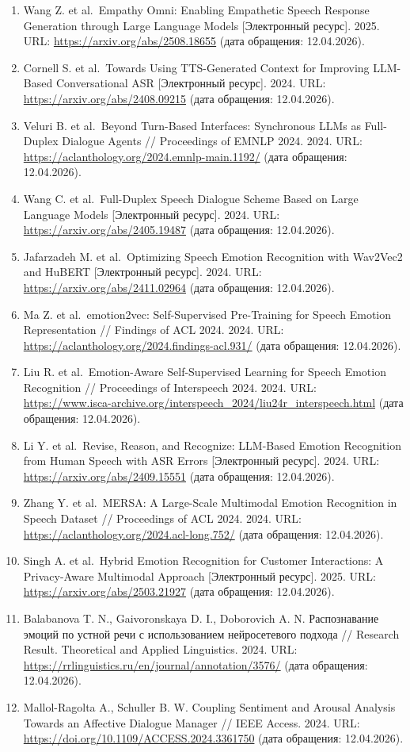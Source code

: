 \documentclass[a4paper,14pt]{extarticle}
\begin{document}
\begin{enumerate}
\item
  Wang Z. et al.~Empathy Omni: Enabling Empathetic Speech Response
  Generation through Large Language Models {[}Электронный ресурс{]}.
  2025. URL: \url{https://arxiv.org/abs/2508.18655} (дата обращения:
  12.04.2026).
\item
  Cornell S. et al.~Towards Using TTS-Generated Context for Improving
  LLM-Based Conversational ASR {[}Электронный ресурс{]}. 2024. URL:
  \url{https://arxiv.org/abs/2408.09215} (дата обращения: 12.04.2026).
\item
  Veluri B. et al.~Beyond Turn-Based Interfaces: Synchronous LLMs as
  Full-Duplex Dialogue Agents // Proceedings of EMNLP 2024. 2024. URL:
  \url{https://aclanthology.org/2024.emnlp-main.1192/} (дата обращения:
  12.04.2026).
\item
  Wang C. et al.~Full-Duplex Speech Dialogue Scheme Based on Large
  Language Models {[}Электронный ресурс{]}. 2024. URL:
  \url{https://arxiv.org/abs/2405.19487} (дата обращения: 12.04.2026).
\item
  Jafarzadeh M. et al.~Optimizing Speech Emotion Recognition with
  Wav2Vec2 and HuBERT {[}Электронный ресурс{]}. 2024. URL:
  \url{https://arxiv.org/abs/2411.02964} (дата обращения: 12.04.2026).
\item
  Ma Z. et al.~emotion2vec: Self-Supervised Pre-Training for Speech
  Emotion Representation // Findings of ACL 2024. 2024. URL:
  \url{https://aclanthology.org/2024.findings-acl.931/} (дата обращения:
  12.04.2026).
\item
  Liu R. et al.~Emotion-Aware Self-Supervised Learning for Speech
  Emotion Recognition // Proceedings of Interspeech 2024. 2024. URL:
  \url{https://www.isca-archive.org/interspeech_2024/liu24r_interspeech.html}
  (дата обращения: 12.04.2026).
\item
  Li Y. et al.~Revise, Reason, and Recognize: LLM-Based Emotion
  Recognition from Human Speech with ASR Errors {[}Электронный
  ресурс{]}. 2024. URL: \url{https://arxiv.org/abs/2409.15551} (дата
  обращения: 12.04.2026).
\item
  Zhang Y. et al.~MERSA: A Large-Scale Multimodal Emotion Recognition in
  Speech Dataset // Proceedings of ACL 2024. 2024. URL:
  \url{https://aclanthology.org/2024.acl-long.752/} (дата обращения:
  12.04.2026).
\item
  Singh A. et al.~Hybrid Emotion Recognition for Customer Interactions:
  A Privacy-Aware Multimodal Approach {[}Электронный ресурс{]}. 2025.
  URL: \url{https://arxiv.org/abs/2503.21927} (дата обращения:
  12.04.2026).
\item
  Balabanova T. N., Gaivoronskaya D. I., Doborovich A. N. Распознавание
  эмоций по устной речи с использованием нейросетевого подхода //
  Research Result. Theoretical and Applied Linguistics. 2024. URL:
  \url{https://rrlinguistics.ru/en/journal/annotation/3576/} (дата
  обращения: 12.04.2026).
\item
  Mallol-Ragolta A., Schuller B. W. Coupling Sentiment and Arousal
  Analysis Towards an Affective Dialogue Manager // IEEE Access. 2024.
  URL: \url{https://doi.org/10.1109/ACCESS.2024.3361750} (дата
  обращения: 12.04.2026).
\end{enumerate}
\end{document}
